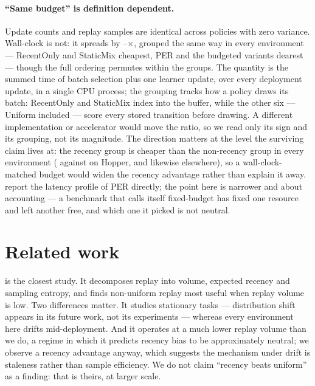 \documentclass{article}
\begin{document}
\paragraph{``Same budget'' is definition dependent.} Update counts and replay
samples are identical across policies with zero variance. Wall-clock is not:
it spreads by \WallSpreadMin--\WallSpreadMax$\times$, grouped the same way in
every environment --- \textsf{RecentOnly} and \textsf{StaticMix} cheapest,
PER and the budgeted variants dearest --- though the full ordering permutes
within the groups. The quantity is the summed time of batch selection plus one
learner update, over every deployment update, in a single CPU process; the
grouping tracks how a policy draws its batch: \textsf{RecentOnly} and
\textsf{StaticMix} index into the buffer, while the other six ---
\textsf{Uniform} included --- score every stored transition before drawing.
A different
implementation or accelerator would move the ratio, so we read only its sign
and its grouping, not its magnitude. The direction matters at the level the surviving claim
lives at: the recency group is cheaper than the non-recency group in every
environment (\RecWallHopper{} against \NonWallHopper{} on Hopper, and
likewise elsewhere), so a wall-clock-matched budget would widen the recency
advantage rather than explain it away. \citet{korniak2026nonuniform}
report the latency profile of PER directly; the point here is narrower and about
accounting --- a benchmark that calls itself fixed-budget has fixed one resource
and left another free, and which one it picked is not neutral.

\section{Related work}

\citet{korniak2026nonuniform} is the closest study. It decomposes replay into
volume, expected recency and sampling entropy, and finds non-uniform replay most
useful when replay volume is low. Two differences matter. It studies stationary
tasks --- distribution shift appears in its future work, not its experiments ---
whereas every environment here drifts mid-deployment. And it operates at a much
lower replay volume than we do, a regime in which it predicts recency bias to be
approximately neutral; we observe a recency advantage anyway, which suggests the
mechanism under drift is staleness rather than sample efficiency. We do not
claim ``recency beats uniform'' as a finding: that is theirs, at larger scale.
\end{document}
